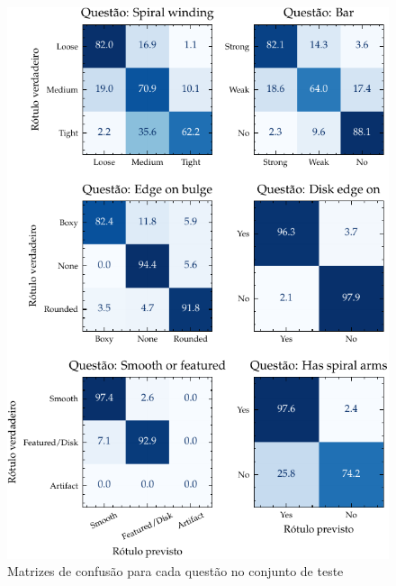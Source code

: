 \begin{figure}[!ht]
  \centering
  \includegraphics[width=\linewidth]{notebooks/plots/cm_1.pdf}
  \caption{Matrizes de confusão para cada questão no conjunto de teste}
  \label{fig:cm_1}
\end{figure}

